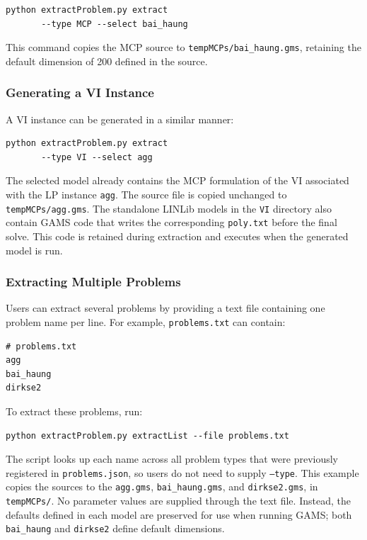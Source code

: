 \begin{verbatim}
python extractProblem.py extract 
       --type MCP --select bai_haung
\end{verbatim}

This command copies the MCP source to \texttt{tempMCPs/bai\_haung.gms}, retaining the default dimension of 200 defined in the source.


\subsubsection{Generating a VI Instance}

A VI instance can be generated in a similar manner:

\begin{verbatim}
python extractProblem.py extract 
       --type VI --select agg
\end{verbatim}

The selected model already contains the MCP formulation of the VI associated with the LP instance \texttt{agg}. The source file is copied unchanged to \texttt{tempMCPs/agg.gms}. The standalone LINLib models in the \texttt{VI} directory also contain GAMS code that writes the corresponding \texttt{poly.txt} before the final solve. This code is retained during extraction and executes when the generated model is run.

\subsubsection{Extracting Multiple Problems}

Users can extract several problems by providing a text file containing one problem name per line. For example, \texttt{problems.txt} can contain:

\begin{verbatim}
# problems.txt
agg
bai_haung
dirkse2
\end{verbatim}

To extract these problems, run:

\begin{verbatim}
python extractProblem.py extractList --file problems.txt
\end{verbatim}

The script looks up each name across all problem types that were previously registered in \texttt{problems.json}, so users do not need to supply \texttt{--type}. This example copies the sources to the \texttt{agg.gms}, \texttt{bai\_haung.gms}, and \texttt{dirkse2.gms}, in \texttt{tempMCPs/}. No parameter values are supplied through the text file. Instead, the defaults defined in each model are preserved for use when running GAMS; both \texttt{bai\_haung} and \texttt{dirkse2} define default dimensions.

